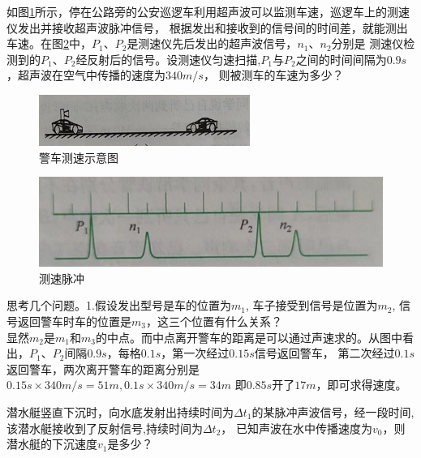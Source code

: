 \documentclass[windows,csize4, answers]{BHCexam}
\begin{document}
\begin{groups}
\begin{questions}[]
        \question[5] 如图\ref{fig:fig_2_7}所示，停在公路旁的公安巡逻车利用超声波可以监测车速，巡逻车上的测速仪发出并接收超声波脉冲信号，
        根据发出和接收到的信号间的时间差，就能测出车速。在图\ref{fig:fig_2_8}中，$P_1$、$P_2$是测速仪先后发出的超声波信号，$n_1$、$n_2$分别是
        测速仪检测到的$P_1$、$P_2$经反射后的信号。设测速仪匀速扫描,$P_1$与$P_2$之间的时间间隔为$0.9s$，超声波在空气中传播的速度为$340m/s$，
        则被测车的车速为多少？
        \begin{figure}[htb]
            \centering
            \includegraphics [scale=0.75,trim=0 0 0 0]{./image/fig_2_7.PNG}
            \caption{警车测速示意图}
            \label{fig:fig_2_7}
        \end{figure}
        \begin{figure}[htb]
            \centering
            \includegraphics [scale=0.75,trim=0 0 0 0]{./image/fig_2_8.PNG}
            \caption{测速脉冲}
            \label{fig:fig_2_8}
        \end{figure}
        \begin{solution}{0.5cm}
            \methodonly 思考几个问题。1.假设发出型号是车的位置为$m_1$, 车子接受到信号是位置为$m_2$, 信号返回警车时车的位置是$m_3$，这三个位置有什么关系？\\
            显然$m_2$是$m_1$和$m_3$的中点。而中点离开警车的距离是可以通过声速求的。从图中看出，$P_1$、$P_2$间隔$0.9s$，每格$0.1s$，第一次经过$0.15s$信号返回警车，
            第二次经过$0.1s$返回警车，两次离开警车的距离分别是$0.15s\times 340m/s=51m,0.1s\times 340m/s=34m$ 即$0.85s$开了$17m$，即可求得速度。
        \end{solution}


    \end{questions}

    \begin{questions}[]
        \question[5] 潜水艇竖直下沉时，向水底发射出持续时间为$\Delta t_1$的某脉冲声波信号，经一段时间,该潜水艇接收到了反射信号,持续时间为$\Delta t_2$，
        已知声波在水中传播速度为$v_0$，则潜水艇的下沉速度$v_1$是多少？



    \end{questions}
















\end{groups}




\label{lastpage}
\end{document}
